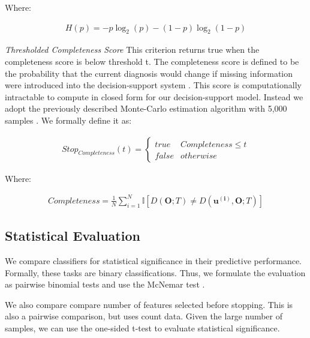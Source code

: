 Where:

\begin{align}
H(p) = -p\log_2(p) - (1-p)\log_2(1-p)
\end{align}


\emph{Thresholded Completeness Score}
This criterion returns true when the completeness score is below threshold t. The completeness score is defined to be the probability that the current diagnosis would change if missing information were introduced into the decision-support system \cite{Gimenez:2014tr}. This score is computationally intractable to compute in closed form for our decision-support model. Instead we adopt the previously described Monte-Carlo estimation algorithm with 5,000 samples \cite{Gimenez:2014tr}. We formally define it as:

\begin{align}
Stop_{Completeness}(t) =
\begin{cases} 
true & Completeness \leq t \\
false & otherwise
\end{cases}
\end{align}

Where:

\begin{align}
Completeness = \frac{1}{N}\sum_{i =1 }^{N}\mathbb{I}\left[D(\mathbf{O};T) \neq D(\mathbf{u^{(i)}},\mathbf{O};T)\right]
\end{align}



\subsection{Statistical Evaluation}
We compare classifiers for statistical significance in their predictive performance. Formally, these tasks are binary classifications. Thus, we formulate the evaluation as pairwise binomial tests and use the McNemar test \cite{Stock:2014tn}.

We also compare compare number of features selected before stopping. This is also a pairwise comparison, but uses count data. Given the large number of samples, we can use the one-sided t-test to evaluate statistical significance.
